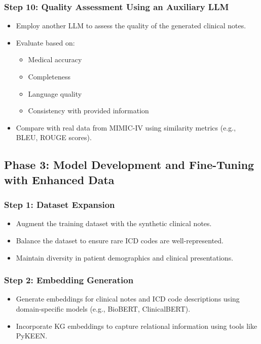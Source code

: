\documentclass[12pt, a4paper]{article}
\begin{document}
\subsubsection{Step 10: Quality Assessment Using an Auxiliary LLM}

\begin{itemize}
    \item Employ another LLM to assess the quality of the generated clinical notes.
    \item Evaluate based on:
    \begin{itemize}
        \item Medical accuracy
        \item Completeness
        \item Language quality
        \item Consistency with provided information
    \end{itemize}
    \item Compare with real data from MIMIC-IV using similarity metrics (e.g., BLEU, ROUGE scores).
\end{itemize}

\subsection{Phase 3: Model Development and Fine-Tuning with Enhanced Data}

\subsubsection{Step 1: Dataset Expansion}

\begin{itemize}
    \item Augment the training dataset with the synthetic clinical notes.
    \item Balance the dataset to ensure rare ICD codes are well-represented.
    \item Maintain diversity in patient demographics and clinical presentations.
\end{itemize}

\subsubsection{Step 2: Embedding Generation}

\begin{itemize}
    \item Generate embeddings for clinical notes and ICD code descriptions using domain-specific models (e.g., BioBERT, ClinicalBERT).
    \item Incorporate KG embeddings to capture relational information using tools like PyKEEN.
\end{itemize}
\end{document}
